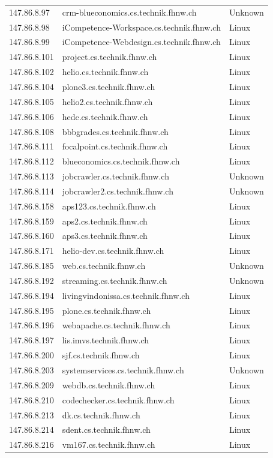 \documentclass[a4paper,11pt]{scrartcl}
\begin{document}
\begin{longtable}{p{2.5cm}|p{8cm}|l}
	147.86.8.97 & crm-blueconomics.cs.technik.fhnw.ch & Unknown\\
	147.86.8.98 & iCompetence-Workspace.cs.technik.fhnw.ch & Linux\\
	147.86.8.99 & iCompetence-Webdesign.cs.technik.fhnw.ch & Linux\\
	147.86.8.101 & project.cs.technik.fhnw.ch & Linux\\
	147.86.8.102 & helio.cs.technik.fhnw.ch & Linux\\
	147.86.8.104 & plone3.cs.technik.fhnw.ch & Linux\\
	147.86.8.105 & helio2.cs.technik.fhnw.ch & Linux\\
	147.86.8.106 & hedc.cs.technik.fhnw.ch & Linux\\
	147.86.8.108 & bbbgrades.cs.technik.fhnw.ch & Linux\\
	147.86.8.111 & focalpoint.cs.technik.fhnw.ch & Linux\\
	147.86.8.112 & blueconomics.cs.technik.fhnw.ch & Linux\\
	147.86.8.113 & jobcrawler.cs.technik.fhnw.ch & Unknown\\
	147.86.8.114 & jobcrawler2.cs.technik.fhnw.ch & Unknown\\
	147.86.8.158 & aps123.cs.technik.fhnw.ch & Linux\\
	147.86.8.159 & aps2.cs.technik.fhnw.ch & Linux\\
	147.86.8.160 & aps3.cs.technik.fhnw.ch & Linux\\
	147.86.8.171 & helio-dev.cs.technik.fhnw.ch & Linux\\
	147.86.8.185 & web.cs.technik.fhnw.ch & Unknown\\
	147.86.8.192 & streaming.cs.technik.fhnw.ch & Unknown\\
	147.86.8.194 & livingvindonissa.cs.technik.fhnw.ch & Linux\\
	147.86.8.195 & plone.cs.technik.fhnw.ch & Linux\\
	147.86.8.196 & webapache.cs.technik.fhnw.ch & Linux\\
	147.86.8.197 & lis.imvs.technik.fhnw.ch & Linux\\
	147.86.8.200 & sjf.cs.technik.fhnw.ch & Linux\\
	147.86.8.203 & systemservices.cs.technik.fhnw.ch & Unknown\\
	147.86.8.209 & webdb.cs.technik.fhnw.ch & Linux\\
	147.86.8.210 & codechecker.cs.technik.fhnw.ch & Linux\\
	147.86.8.213 & dk.cs.technik.fhnw.ch & Linux\\
	147.86.8.214 & sdent.cs.technik.fhnw.ch & Linux\\
	147.86.8.216 & vm167.cs.technik.fhnw.ch & Linux\\
\end{longtable}
\end{document}
